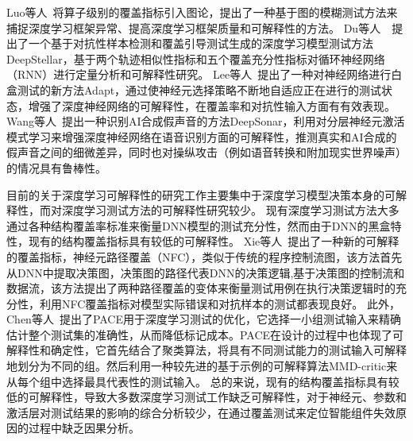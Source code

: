 Luo等人~将算子级别的覆盖指标引入图论，提出了一种基于图的模糊测试方法来捕捉深度学习框架异常、提高深度学习框架质量和可解释性的方法。
Du等人~~提出了一个基于对抗性样本检测和覆盖引导测试生成的深度学习模型测试方法DeepStellar，基于两个轨迹相似性指标和五个覆盖充分性指标对循环神经网络（RNN）进行定量分析和可解释性研究。
Lee等人~提出了一种对神经网络进行白盒测试的新方法Adapt，通过使神经元选择策略不断地自适应正在进行的测试状态，增强了深度神经网络的可解释性，在覆盖率和对抗性输入方面有有效表现。
Wang等人~提出一种识别AI合成假声音的方法DeepSonar，利用对分层神经元激活模式学习来增强深度神经网络在语音识别方面的可解释性，推测真实和AI合成的假声音之间的细微差异，同时也对操纵攻击（例如语音转换和附加现实世界噪声）的情况具有鲁棒性。
\fi



目前的关于深度学习可解释性的研究工作主要集中于深度学习模型决策本身的可解释性，而对深度学习测试方法的可解释性研究较少。
现有深度学习测试方法大多通过各种结构覆盖率标准来衡量DNN模型的测试充分性，然而由于DNN的黑盒特性，现有的结构覆盖指标具有较低的可解释性。
Xie等人~提出了一种新的可解释的覆盖指标，神经元路径覆盖（NFC），类似于传统的程序控制流图，该方法首先从DNN中提取决策图，决策图的路径代表DNN的决策逻辑,基于决策图的控制流和数据流，该方法提出了两种路径覆盖的变体来衡量测试用例在执行决策逻辑时的充分性，利用NFC覆盖指标对模型实际错误和对抗样本的测试都表现良好。
此外，Chen等人~提出了PACE用于深度学习测试的优化，它选择一小组测试输入来精确估计整个测试集的准确性，从而降低标记成本。PACE在设计的过程中也体现了可解释性和确定性，它首先结合了聚类算法，将具有不同测试能力的测试输入可解释地划分为不同的组。然后利用一种较先进的基于示例的可解释算法MMD-critic来从每个组中选择最具代表性的测试输入。
总的来说，现有的结构覆盖指标具有较低的可解释性，导致大多数深度学习测试工作缺乏可解释性，对于神经元、参数和激活层对测试结果的影响的综合分析较少，在通过覆盖测试来定位智能组件失效原因的过程中缺乏因果分析。



























\begin{spacing}{1.3} %
	 \songti
	
	
	\vspace{11bp}
\end{spacing}
